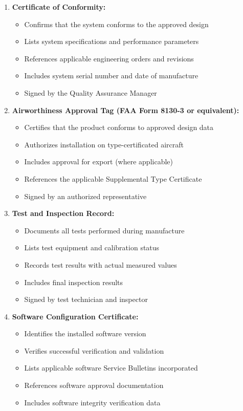 \documentclass[12pt,a4paper,twoside,openright]{book}
\begin{document}
\begin{enumerate}
    \item \textbf{Certificate of Conformity:}
    \begin{itemize}
        \item Confirms that the system conforms to the approved design
        \item Lists system specifications and performance parameters
        \item References applicable engineering orders and revisions
        \item Includes system serial number and date of manufacture
        \item Signed by the Quality Assurance Manager
    \end{itemize}
    
    \item \textbf{Airworthiness Approval Tag (FAA Form 8130-3 or equivalent):}
    \begin{itemize}
        \item Certifies that the product conforms to approved design data
        \item Authorizes installation on type-certificated aircraft
        \item Includes approval for export (where applicable)
        \item References the applicable Supplemental Type Certificate
        \item Signed by an authorized representative
    \end{itemize}
    
    \item \textbf{Test and Inspection Record:}
    \begin{itemize}
        \item Documents all tests performed during manufacture
        \item Lists test equipment and calibration status
        \item Records test results with actual measured values
        \item Includes final inspection results
        \item Signed by test technician and inspector
    \end{itemize}
    
    \item \textbf{Software Configuration Certificate:}
    \begin{itemize}
        \item Identifies the installed software version
        \item Verifies successful verification and validation
        \item Lists applicable software Service Bulletins incorporated
        \item References software approval documentation
        \item Includes software integrity verification data
    \end{itemize}
\end{enumerate}
\end{document}
